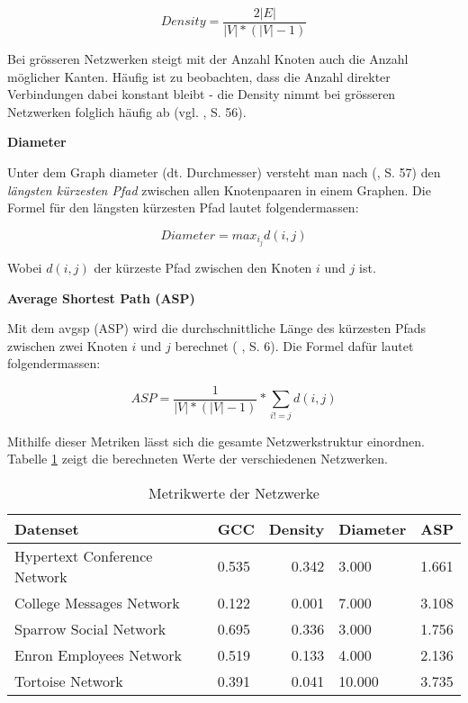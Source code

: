 \begin{equation}
    \label{eq:density}
    Density = \frac{2|E|}{|V|*(|V|-1)}
\end{equation}


Bei grösseren Netzwerken steigt mit der Anzahl Knoten auch die Anzahl möglicher Kanten.
Häufig ist zu beobachten, dass die Anzahl direkter Verbindungen dabei konstant bleibt - die Density nimmt bei grösseren Netzwerken folglich häufig ab (vgl. \citeauthor{michael_henninger_soziale_2018} \citeyear{michael_henninger_soziale_2018}, S. 56).

\textbf{Diameter}

Unter dem Graph \acs{diameter} (dt. Durchmesser) versteht man nach \citeauthor{michael_henninger_soziale_2018} (\citeyear{michael_henninger_soziale_2018}, S. 57) den \textit{längsten kürzesten Pfad} zwischen allen Knotenpaaren in einem Graphen.
Die Formel für den längsten kürzesten Pfad lautet folgendermassen:

\begin{equation}
    \label{eq:diameter}
    Diameter = max_i_jd(i,j)
\end{equation}

Wobei $d(i,j)$ der kürzeste Pfad zwischen den Knoten $i$ und $j$ ist.

\textbf{Average Shortest Path (ASP)}

Mit dem \acs{avgsp} (ASP) wird die durchschnittliche Länge des kürzesten Pfads zwischen zwei Knoten $i$ und $j$ berechnet (\citeauthor{gao_link_2015} \citeyear{gao_link_2015}, S. 6).
Die Formel dafür lautet folgendermassen:

\begin{equation}
    \label{eq:asp}
    ASP = \frac{1}{|V| * (|V| - 1)} * \sum\limits_{i!=j} d(i,j)
\end{equation}

Mithilfe dieser Metriken lässt sich die gesamte Netzwerkstruktur einordnen.
Tabelle \ref{tab_metrics} zeigt die berechneten Werte der verschiedenen Netzwerken.

\begin{table}[h]
    \centering
    \begin{tabular}{@{}llrll@{}}
        \toprule
        Datenset                         & GCC      & Density      & Diameter & ASP      \\ \midrule
        Hypertext Conference Network                & 0.535 & 0.342 & 3.000 & 1.661 \\
        College Messages Network         & 0.122 & 0.001 & 7.000 & 3.108 \\
        Sparrow Social Network           & 0.695 & 0.336 & 3.000 & 1.756 \\
        Enron Employees Network          & 0.519 & 0.133 & 4.000 & 2.136 \\
        Tortoise Network                 & 0.391 & 0.041 & 10.000 & 3.735 \\ \bottomrule
    \end{tabular}%
    \caption{Metrikwerte der Netzwerke}
    \label{tab_metrics}
\end{table}

